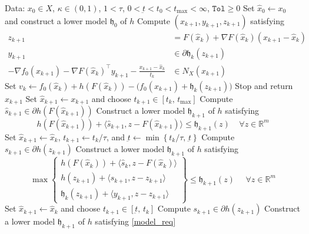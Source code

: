 \documentclass[10pt,a4paper]{amsart}
\newcommand{\col}[1]{\left\{#1\right\}}
\newcommand{\inner}[2]{\langle#1,#2\rangle}
\newcommand{\modelh}{\mathfrak{h}}
\newcommand{\reals}{\mathbb{R}}
\newcommand{\tol}{\texttt{Tol}}
\begin{document}
\begin{algorithm}[htb]
\caption{Composite Proximal Bundle Method}
\label{bundlemethod}
\begin{algorithmic}[1]
{\footnotesize
\State  Data: $x_0\in X$, $\kappa \in (0,1)$, $1<\tau $, $0<\underbar{t}<t_0<t_{\max}<\infty$, $\tol \geq 0$
\State Set $\hat x_0\gets x_0$ and construct a lower model $\modelh_0$ of $h$
\State Compute $(x_{k+1}, y_{k+1}, z_{k+1})$ satisfying \label{line:xkk}
\begin{subequations}\label{eqn:MP}
\begin{align}
z_{k+1} &= F(\hat x_k)+\nabla F(\hat x_k)(x_{k+1}-\hat x_k)\label{eqn:MP1}\\
y_{k+1} &\in \partial \modelh_k(z_{k+1})\label{eqn:MP2}\\
-\nabla f_0(x_{k+1}) - \nabla F(\hat x_k)^\top y_{k+1} - \frac{x_{k+1}-\hat x_k}{t_k} &\in N_X(x_{k+1})\label{eqn:MP3} 
\end{align}
\end{subequations}
\State Set $v_k\gets f_0(\hat x_k)+h(F(\hat x_k)) - \big(f_0(x_{k+1}) + \modelh_k(z_{k+1})\big)$ \label{line:vk}
\If{$v_k\leq \tol$}
\State Stop and return $x_{k+1}$ %
\EndIf
%
\label{call-oracle-c}
\label{call-oracle-hc}
\State Set $\hat x_{k+1} \gets x_{k+1}$ and choose $t_{k+1}\in [t_k, \,t_{\max}]$
\State Compute $\hat s_{k+1} \in \partial h(F(\hat x_{k+1}))$
\State Construct a lower model $\modelh_{k+1}$ of $h$ satisfying
\[
h(F(\hat x_{k+1}))+\inner{\hat s_{k+1}}{z-F(\hat x_{k+1})}
 \leq \modelh_{k+1}(z)~~~~~\forall z\in \reals^m
\]
\Else
\State Set $ \hat x_{k+1}\gets \hat x_k$, $t_{k+1}\gets t_k/\tau$, and $\underbar{t}\gets \min\col{t_{k}/\tau,\,\underbar{t}}$ \label{line:decrease_t} 
\State Compute $s_{k+1} \in \partial h(z_{k+1})$
\State Construct a lower model $\modelh_{k+1}$ of $h$ satisfying
\begin{equation}\label{model_req}
\max\begin{Bmatrix}
h(F(\hat x_k))+\inner{\hat s_{k}}{z-F(\hat x_k)}\\
h(z_{k+1})+\inner{s_{k+1}}{z-z_{k+1}}\\
\modelh_k(z_{k+1}) + \inner{y_{k+1}}{z - z_{k+1} }
\end{Bmatrix}
 \leq \modelh_{k+1}(z)~~~~~~\forall z\in \reals^m
\end{equation} 
\EndIf
\Else
\State Set $ \hat x_{k+1}\gets \hat x_k$ and choose $t_{k+1}\in [\underbar{t},\, t_k]$ \label{NS}  
\State Compute $s_{k+1} \in \partial h(z_{k+1})$
\State Construct a lower model $\modelh_{k+1}$ of $h$ satisfying \eqref{model_req}
\EndIf
\EndFor
}
  \end{algorithmic}
\end{algorithm}
\end{document}
